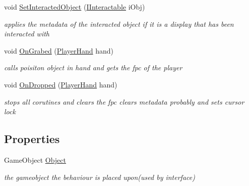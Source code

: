 \begin{DoxyCompactItemize}
void \mbox{\hyperlink{class_meta_data_display_a29b7b1ec6193b73606dc7da89c387529}{Set\+Interacted\+Object}} (\mbox{\hyperlink{interface_i_interactable}{I\+Interactable}} i\+Obj)
\begin{DoxyCompactList}\small\item\em applies the metadata of the interacted object if it is a display that has been interacted with \end{DoxyCompactList}\item 
void \mbox{\hyperlink{class_meta_data_display_a7d639d7bc58c9340a7f5274884bbc11d}{On\+Grabed}} (\mbox{\hyperlink{class_player_hand}{Player\+Hand}} hand)
\begin{DoxyCompactList}\small\item\em calls poisiton object in hand and gets the fpc of the player \end{DoxyCompactList}\item 
void \mbox{\hyperlink{class_meta_data_display_a274478924e6a4df19484a469ae2869ce}{On\+Dropped}} (\mbox{\hyperlink{class_player_hand}{Player\+Hand}} hand)
\begin{DoxyCompactList}\small\item\em stops all corutines and clears the fpc clears metadata probably and sets cursor lock \end{DoxyCompactList}\end{DoxyCompactItemize}
\subsection*{Properties}
\begin{DoxyCompactItemize}
\item 
Game\+Object \mbox{\hyperlink{class_meta_data_display_a6c8c48f48c075530099da10bb4b9b7c4}{Object}}
\begin{DoxyCompactList}\small\item\em the gameobject the behaviour is placed upon(used by interface) \end{DoxyCompactList}\end{DoxyCompactItemize}
